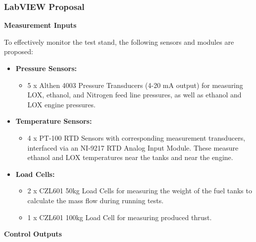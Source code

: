 \subsubsection{LabVIEW Proposal}

    \textbf{Measurement Inputs}
    
    To effectively monitor the test stand, the following sensors and modules are proposed:
    
    \begin{itemize}
        \item \textbf{Pressure Sensors:}
        \begin{itemize}
            \item 5 x Althen 4003 Pressure Transducers (4-20 mA output) for measuring LOX, ethanol, and Nitrogen feed line pressures, as well as ethanol and LOX engine pressures.
        \end{itemize}
        \item \textbf{Temperature Sensors:}
        \begin{itemize}
            \item 4 x PT-100 RTD Sensors with corresponding measurement transducers, interfaced via an NI-9217 RTD Analog Input Module. These measure ethanol and LOX temperatures near the tanks and near the engine.
        \end{itemize}
        \item \textbf{Load Cells:}
        \begin{itemize}
            \item 2 x CZL601 50kg Load Cells for measuring the weight of the fuel tanks to calculate the mass flow during running tests.
            \item 1 x CZL601 100kg Load Cell for measuring produced thrust.
        \end{itemize}
    \end{itemize}
    
    \textbf{Control Outputs}
    
